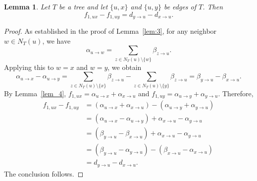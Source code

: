 \documentclass[12pt,amscd]{amsart}
\newtheorem{lem}[thm]{Lemma}
\theoremstyle{definition}
\numberwithin{equation}{section}
\begin{document}
\begin{lem}\label{lem_7} 
Let $T$ be a tree and let $\{u,x\}$ and $\{u,y\}$ be edges of $T$. Then 
\[
f_{1,ux} - f_{1,uy} = d_{y \to u} - d_{x \to u}.
\]
\end{lem}

\begin{proof} 
As established in the proof of Lemma~\ref{lem:3}, for any neighbor $w \in N_T(u)$, we have
\[
\alpha_{u \to w} = \sum_{z \in N_T(u) \setminus \{w\}} \beta_{z \to u}.
\]
Applying this to $w = x$ and $w = y$, we obtain
\[
\alpha_{u \to x} - \alpha_{u \to y} = \sum_{z \in N_T(u) \setminus \{x\}} \beta_{z \to u} - \sum_{z \in N_T(u) \setminus \{y\}} \beta_{z \to u} = \beta_{y \to u} - \beta_{x \to u}.
\]
By Lemma~\ref{lem_4}, $f_{1,ux} = \alpha_{u \to x} + \alpha_{x \to u}$ and $f_{1,uy} = \alpha_{u \to y} + \alpha_{y \to u}$. Therefore,
\begin{align*}
f_{1,ux} - f_{1,uy} &= (\alpha_{u \to x} + \alpha_{x \to u}) - (\alpha_{u \to y} + \alpha_{y \to u}) \\
&= (\alpha_{u \to x} - \alpha_{u \to y}) + \alpha_{x \to u} - \alpha_{y \to u} \\
&= (\beta_{y \to u} - \beta_{x \to u}) + \alpha_{x \to u} - \alpha_{y \to u} \\
&= (\beta_{y \to u} - \alpha_{y \to u}) - (\beta_{x \to u} - \alpha_{x \to u}) \\
&= d_{y \to u} - d_{x \to u}.
\end{align*}
The conclusion follows.
\end{proof}
\end{document}
